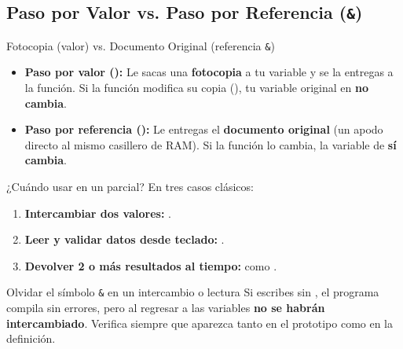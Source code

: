 \documentclass[11pt,letterpaper]{article}
\begin{document}


\subsection{Paso por Valor vs. Paso por Referencia (\texttt{\&})}

\begin{paratontos}{Fotocopia (valor) vs. Documento Original (referencia \texttt{\&})}
\begin{itemize}
  \item \textbf{Paso por valor ():} Le sacas una \textbf{fotocopia} a tu variable y se la entregas a la función. Si la función modifica su copia (), tu variable original en  \textbf{no cambia}.
  \item \textbf{Paso por referencia ():} Le entregas el \textbf{documento original} (un apodo directo al mismo casillero de RAM). Si la función lo cambia, la variable de  \textbf{sí cambia}.
\end{itemize}
\end{paratontos}

¿Cuándo usar \codigo{\&} en un parcial? En tres casos clásicos:
\begin{enumerate}
  \item \textbf{Intercambiar dos valores:} .
  \item \textbf{Leer y validar datos desde teclado:} .
  \item \textbf{Devolver 2 o más resultados al tiempo:} como .
\end{enumerate}

\begin{peligro}{Olvidar el símbolo \texttt{\&} en un intercambio o lectura}
Si escribes  sin \codigo{\&}, el programa compila sin errores, pero al regresar a  las variables \textbf{no se habrán intercambiado}. Verifica siempre que \codigo{\&} aparezca tanto en el prototipo como en la definición.
\end{peligro}


\end{document}
